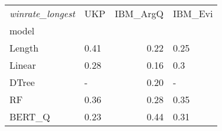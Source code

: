 \begin{tabular}{llrl}
\toprule
\textit{winrate\_longest} &   UKP &  IBM\_ArgQ & IBM\_Evi \\
model  &       &           &         \\
\midrule
Length &  0.41 &      0.22 &    0.25 \\
Linear &  0.28 &      0.16 &     0.3 \\
DTree  &     - &      0.20 &       - \\
RF     &  0.36 &      0.28 &    0.35 \\
BERT\_Q &  0.23 &      0.44 &    0.31 \\
\bottomrule
\end{tabular}
